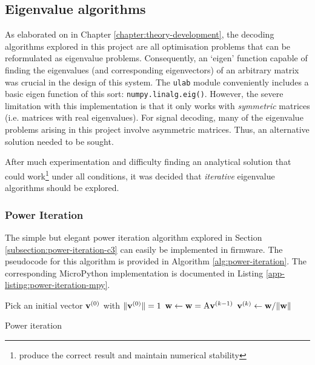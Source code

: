 \subsection{Eigenvalue algorithms}
As elaborated on in Chapter \ref{chapter:theory-development}, the decoding algorithms explored in this project are all optimisation problems that can be reformulated as eigenvalue problems. Consequently, an `eigen' function capable of finding the eigenvalues (and corresponding eigenvectors) of an arbitrary matrix was crucial in the design of this system. The \texttt{ulab} module conveniently includes a basic eigen function of this sort: \texttt{numpy.linalg.eig()}. However, the severe limitation with this implementation is that it only works with \textit{symmetric} matrices (i.e. matrices with real eigenvalues). For signal decoding, many of the eigenvalue problems arising in this project involve asymmetric matrices. Thus, an alternative solution needed to be sought. 

After much experimentation and difficulty finding an analytical solution that could work\footnote{produce the correct result and maintain numerical stability} under all conditions, it was decided that \textit{iterative} eigenvalue algorithms should be explored. 

\subsubsection{Power Iteration}
The simple but elegant power iteration algorithm explored in Section \ref{subsection:power-iteration-c3} can easily be implemented in firmware. The pseudocode for this algorithm is provided in Algorithm \ref{alg:power-iteration}. The corresponding MicroPython implementation is documented in Listing \ref{app-listing:power-iteration-mpy}.
\begin{algorithm}
\begin{algorithmic}
\State Pick an initial vector ${\mathbf{v}}^{(0)}$ with $\|{\mathbf{v}}^{(0)}\|=1$ 
 
    \State ${\mathbf{w}} \gets {\mathbf{w}} = {\textrm{A}}{\mathbf{v}}^{(k-1)}$ 
    \State ${\mathbf{v}}^{(k)} \gets {\mathbf{w}} / \| {\mathbf{w}}\|$ 
\EndFor
\end{algorithmic}
\caption{Power iteration}
\label{alg:power-iteration}
\end{algorithm}

